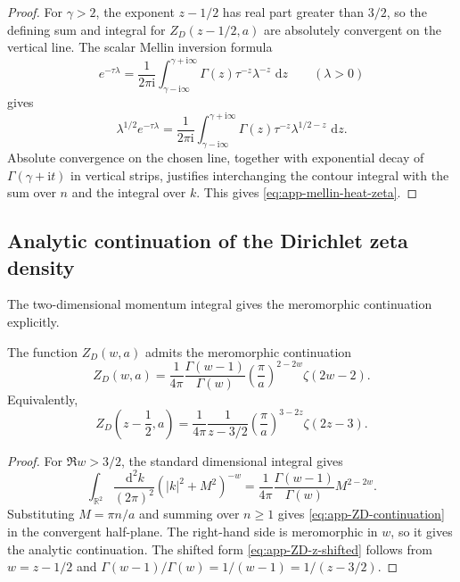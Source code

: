 \documentclass[11pt]{article}
\providecommand{\R}{\mathbb{R}}
\providecommand{\ii}{\mathrm{i}}
\providecommand{\dd}{\,\mathrm{d}}
\providecommand{\abs}[1]{\left\lvert #1\right\rvert}
\providecommand{\paren}[1]{\left(#1\right)}
\numberwithin{equation}{section}
\begin{document}
\begin{proof}
For \(\gamma>2\), the exponent \(z-1/2\) has real part greater than \(3/2\),
so the defining sum and integral for \(Z_D(z-1/2,a)\) are absolutely
convergent on the vertical line.  The scalar Mellin inversion formula
\[
    e^{-\tau\lambda}
    =
    \frac{1}{2\pi\ii}
    \int_{\gamma-\ii\infty}^{\gamma+\ii\infty}
    \Gamma(z)\tau^{-z}\lambda^{-z}\,\dd z
    \qquad(\lambda>0)
\]
gives
\[
    \lambda^{1/2}e^{-\tau\lambda}
    =
    \frac{1}{2\pi\ii}
    \int_{\gamma-\ii\infty}^{\gamma+\ii\infty}
    \Gamma(z)\tau^{-z}\lambda^{1/2-z}\,\dd z .
\]
Absolute convergence on the chosen line, together with exponential decay of
\(\Gamma(\gamma+\ii t)\) in vertical strips, justifies interchanging the contour
integral with the sum over \(n\) and the integral over \(k\).  This gives
\eqref{eq:app-mellin-heat-zeta}.
\end{proof}

\subsection{Analytic continuation of the Dirichlet zeta density}
\label{subsec:app-ZD-continuation}

The two-dimensional momentum integral gives the meromorphic continuation
explicitly.

\begin{proposition}
\label{prop:app-ZD-continuation}
The function \(Z_D(w,a)\) admits the meromorphic continuation
\begin{equation}
\label{eq:app-ZD-continuation}
    Z_D(w,a)
    =
    \frac{1}{4\pi}
    \frac{\Gamma(w-1)}{\Gamma(w)}
    \paren{\frac{\pi}{a}}^{2-2w}
    \zeta(2w-2).
\end{equation}
Equivalently,
\begin{equation}
\label{eq:app-ZD-z-shifted}
    Z_D\paren{z-\frac12,a}
    =
    \frac{1}{4\pi}
    \frac{1}{z-3/2}
    \paren{\frac{\pi}{a}}^{3-2z}
    \zeta(2z-3).
\end{equation}
\end{proposition}

\begin{proof}
For \(\Re w>3/2\), the standard dimensional integral gives
\begin{equation}
\label{eq:app-dimensional-integral}
    \int_{\R^2}\frac{\dd^2k}{(2\pi)^2}
    \paren{\abs{k}^2+M^2}^{-w}
    =
    \frac{1}{4\pi}\frac{\Gamma(w-1)}{\Gamma(w)}M^{2-2w}.
\end{equation}
Substituting \(M=\pi n/a\) and summing over \(n\ge1\) gives
\eqref{eq:app-ZD-continuation} in the convergent half-plane.  The right-hand
side is meromorphic in \(w\), so it gives the analytic continuation.  The
shifted form \eqref{eq:app-ZD-z-shifted} follows from \(w=z-1/2\) and
\(\Gamma(w-1)/\Gamma(w)=1/(w-1)=1/(z-3/2)\).
\end{proof}
\end{document}
